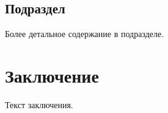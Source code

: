 \documentclass[12pt]{article}    %
\begin{document}
\subsection{Подраздел}

Более детальное содержание в подразделе.

\section{Заключение}

Текст заключения.


\end{document}
